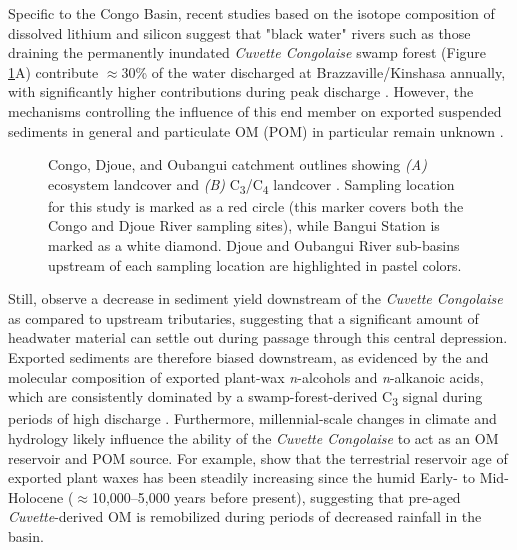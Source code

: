 Specific to the Congo Basin, recent studies based on the isotope composition of dissolved lithium and silicon suggest that "black water" rivers such as those draining the permanently inundated \textit{Cuvette Congolaise} swamp forest (Figure \ref{Ch5Fig:1}A) contribute $\approx 30$\% of the water discharged at Brazzaville/Kinshasa annually, with significantly higher contributions during peak discharge \citep{Cardinal:2010ir,Henchiri:2016jh}. However, the mechanisms controlling the influence of this end member on exported suspended sediments in general and particulate OM (POM) in particular remain unknown \citep{Spencer:2016ho}.

\begin{figure}[ht]
	\caption[Congo catchment map showing landcover and \%C\textsubscript{3} vs. \%C\textsubscript{4} vegatation]{Congo, Djoue, and Oubangui catchment outlines showing \textit{(A)} ecosystem landcover \citep{Mayaux:2004uw} and \textit{(B)} C\textsubscript{3}/C\textsubscript{4} landcover \citep{Still:2010wh}. Sampling location for this study is marked as a red circle (this marker covers both the Congo and Djoue River sampling sites), while Bangui Station \citep{Bouillon:2012cw,Bouillon:2014ko} is marked as a white diamond. Djoue and Oubangui River sub-basins upstream of each sampling location are highlighted in pastel colors.}
	\label{Ch5Fig:1} 
\end{figure}

Still, \citet{Laraque:2009fz} observe a decrease in sediment yield downstream of the \textit{Cuvette Congolaise} as compared to upstream tributaries, suggesting that a significant amount of headwater material can settle out during passage through this central depression. Exported sediments are therefore biased downstream, as evidenced by the  and molecular composition of exported plant-wax \textit{n}-alcohols and \textit{n}-alkanoic acids, which are consistently dominated by a swamp-forest-derived C\textsubscript{3} signal during periods of high discharge \citep{Hemingway:2016bq}. Furthermore, millennial-scale changes in climate and hydrology likely influence the ability of the \textit{Cuvette Congolaise} to act as an OM reservoir and POM source. For example, \citet{Schefuss:2016cp} show that the terrestrial reservoir age of exported plant waxes has been steadily increasing since the humid Early- to Mid-Holocene ($\approx$10,000--5,000 years before present), suggesting that pre-aged \textit{Cuvette}-derived OM is remobilized during periods of decreased rainfall in the basin.


